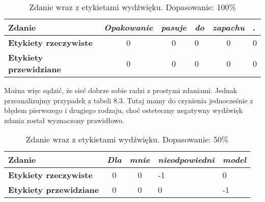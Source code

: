 \begin{table}[H]
\centering
\begin{tabular}{|l|c|c|l|c|l|}
\hline
\textbf{Zdanie}                & \textit{Opakowanie} & \textit{pasuje} & \textit{do} & \textit{zapachu} & . \\ \hline
\textbf{Etykiety rzeczywiste}  & 0                   & 0               & 0           & 0                & 0 \\ \hline
\textbf{Etykiety przewidziane} & 0                   & 0               & 0           & 0                & 0 \\ \hline
\end{tabular}
\caption{Zdanie wraz z etykietami wydźwięku. Dopasowanie: 100\% }
\label{table:bf-sa}
\end{table}
Można więc sądzić, że sieć dobrze sobie radzi z prostymi zdaniami. Jednak przeanalizujmy przypadek z tabeli 8.3. Tutaj mamy do czynienia jednocześnie z błędem pierwszego i drugiego rodzaju, choć osteteczny negatywny wydźwięk zdania został wyznaczony prawidłowo.
\begin{table}[H]
\centering
\begin{tabular}{|l|c|c|l|l|}
\hline
\textbf{Zdanie}                & \textit{Dla} & \textit{mnie} & \textit{nieodpowiedni} & \textit{model} \\ \hline
\textbf{Etykiety rzeczywiste}  & 0            & 0             & -1                     & 0              \\ \hline
\textbf{Etykiety przewidziane} & 0            & 0             & 0                      & -1             \\ \hline
\end{tabular}
\caption{Zdanie wraz z etykietami wydźwięku. Dopasowanie: 50\%}
\end{table}

